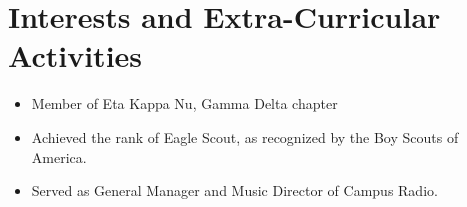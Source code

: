 \documentclass[11pt,a4paper,sans]{moderncv}        %
\begin{document}
\section{Interests and Extra-Curricular Activities}


\begin{itemize}

\item{Member of Eta Kappa Nu, Gamma Delta chapter}
\item{Achieved the rank of Eagle Scout, as recognized by the Boy Scouts of America.}
\item{Served as General Manager and Music Director of Campus Radio.}

\end{itemize}

%


\end{document}
